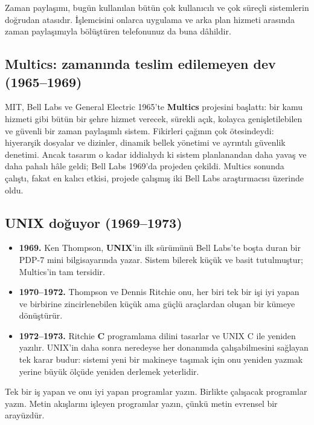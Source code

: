 \documentclass[11pt,a4paper]{article}
\newcommand{\term}[1]{\textbf{\color{mintdeep}#1}}
\begin{document}
Zaman paylaşımı, bugün kullanılan bütün çok kullanıcılı ve çok süreçli sistemlerin doğrudan atasıdır. İşlemcisini onlarca uygulama ve arka plan hizmeti arasında zaman paylaşımıyla bölüştüren telefonunuz da buna dâhildir.

\subsection{Multics: zamanında teslim edilemeyen dev (1965--1969)}

MIT, Bell Labs ve General Electric 1965'te \term{Multics} projesini başlattı: bir kamu hizmeti gibi bütün bir şehre hizmet verecek, sürekli açık, kolayca genişletilebilen ve güvenli bir zaman paylaşımlı sistem. Fikirleri çağının çok ötesindeydi: hiyerarşik dosyalar ve dizinler, dinamik bellek yönetimi ve ayrıntılı güvenlik denetimi. Ancak tasarım o kadar iddialıydı ki sistem planlanandan daha yavaş ve daha pahalı hâle geldi; Bell Labs 1969'da projeden çekildi. Multics sonunda çalıştı, fakat en kalıcı etkisi, projede çalışmış iki Bell Labs araştırmacısı üzerinde oldu.

\subsection{UNIX doğuyor (1969--1973)}

\begin{itemize}
  \item \textbf{1969.} Ken Thompson, \term{UNIX}'in ilk sürümünü Bell Labs'te boşta duran bir PDP-7 mini bilgisayarında yazar. Sistem bilerek küçük ve basit tutulmuştur; Multics'in tam tersidir.
  \item \textbf{1970--1972.} Thompson ve Dennis Ritchie onu, her biri tek bir işi iyi yapan ve birbirine zincirlenebilen küçük ama güçlü araçlardan oluşan bir kümeye dönüştürür.
  \item \textbf{1972--1973.} Ritchie \textbf{C} programlama dilini tasarlar ve UNIX C ile yeniden yazılır. UNIX'in daha sonra neredeyse her donanımda çalışabilmesini sağlayan tek karar budur: sistemi yeni bir makineye taşımak için onu yeniden yazmak yerine büyük ölçüde yeniden derlemek yeterlidir.
\end{itemize}

\begin{keyidea}
Tek bir iş yapan ve onu iyi yapan programlar yazın. Birlikte çalışacak programlar yazın. Metin akışlarını işleyen programlar yazın, çünkü metin evrensel bir arayüzdür.
\end{keyidea}
\end{document}

